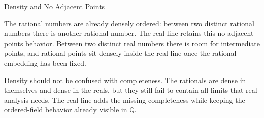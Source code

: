 \label{sec:real-line-density-no-adjacent-points}

\begin{topicbox}{Density and No Adjacent Points}
\begin{exposition}
The rational numbers are already densely ordered: between two distinct
rational numbers there is another rational number. The real line retains
this no-adjacent-points behavior. Between two distinct real numbers there is
room for intermediate points, and rational points sit densely inside the real
line once the rational embedding has been fixed.
\end{exposition}

\begin{exposition}
Density should not be confused with completeness. The rationals are dense in
themselves and dense in the reals, but they still fail to contain all limits
that real analysis needs. The real line adds the missing completeness while
keeping the ordered-field behavior already visible in \(\mathbb Q\).
\end{exposition}
\end{topicbox}


